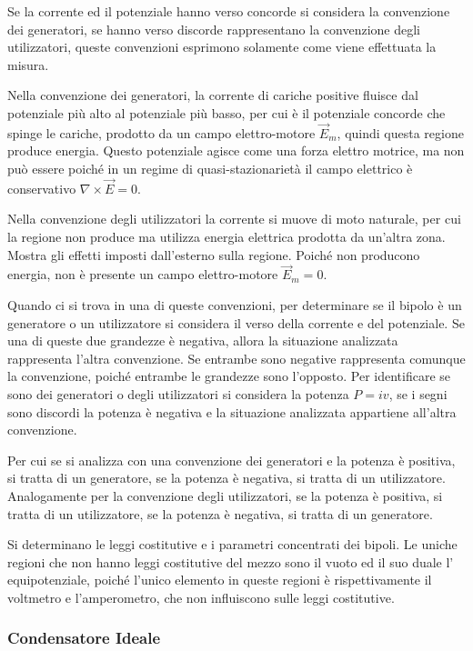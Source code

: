 \documentclass{article}
\numberwithin{equation}{subsection}
\begin{document}
Se la corrente ed il potenziale hanno verso concorde si considera la convenzione dei generatori, se hanno verso discorde rappresentano la convenzione degli utilizzatori, 
queste convenzioni esprimono solamente come viene effettuata la misura. 


Nella convenzione dei generatori, la corrente di cariche positive fluisce dal potenziale più alto al potenziale più basso, per cui è il potenziale concorde che spinge le 
cariche, prodotto da un campo elettro-motore $\vec{E}_m$, quindi questa regione produce energia. Questo potenziale agisce come una forza elettro motrice, ma non può essere 
poiché in un regime di quasi-stazionarietà il campo elettrico è conservativo $\nabla\times\vec{E}=0$. 


Nella convenzione degli utilizzatori la corrente si muove di moto naturale, per cui la regione non produce ma utilizza energia elettrica prodotta da un'altra zona. Mostra 
gli effetti imposti dall'esterno sulla regione. Poiché non producono energia, non è presente un campo elettro-motore $\vec{E}_m=0$. 


Quando ci si trova in una di queste convenzioni, per determinare se il bipolo è un generatore o un utilizzatore si considera il verso della corrente e del potenziale. Se una 
di queste due grandezze è negativa, allora la situazione analizzata rappresenta l'altra convenzione. Se entrambe sono negative rappresenta comunque la convenzione, poiché 
entrambe le grandezze sono l'opposto. Per identificare se sono dei generatori o degli utilizzatori si considera la potenza $P=iv$, se i segni sono discordi la potenza è negativa 
e la situazione analizzata appartiene all'altra convenzione. 

Per cui se si analizza con una convenzione dei generatori e la potenza è positiva, si tratta di un generatore, se la potenza è negativa, si tratta di un utilizzatore. 
Analogamente per la convenzione degli utilizzatori, se la potenza è positiva, si tratta di un utilizzatore, se la potenza è negativa, si tratta di un generatore. 



Si determinano le leggi costitutive e i parametri concentrati dei bipoli. Le uniche regioni che non hanno leggi costitutive del mezzo sono il vuoto ed il suo duale l'
equipotenziale, poiché l'unico elemento in queste regioni è rispettivamente il voltmetro e l'amperometro, che non influiscono sulle leggi costitutive. 

\subsubsection{Condensatore Ideale}
\end{document}
